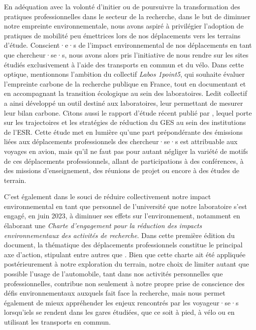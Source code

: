 \begin{refsegment}
En adéquation avec la volonté d'initier ou de poursuivre la transformation des pratiques professionnelles dans le secteur de la recherche, dans le but de diminuer notre empreinte environnementale, nous avons aspiré à privilégier l'adoption de pratiques de mobilité peu émettrices lors de nos déplacements vers les terrains d'étude. Conscient·e·s de l'impact environnemental de nos déplacements en tant que chercheur·se·s, nous avons alors pris l'initiative de nous rendre sur les sites étudiés exclusivement à l'aide des transports en commun et du vélo. Dans cette optique, mentionnons l'ambition du collectif \textsl{Labos 1point5}, qui souhaite évaluer l'empreinte carbone de la recherche publique en France, tout en documentant et en accompagnant la transition écologique au sein des laboratoires. Ledit collectif a ainsi développé un outil destiné aux laboratoires, leur permettant de mesurer leur bilan carbone. Citons aussi le rapport d'étude récent publié par \textcolor{blue}{\textcite[11]{labos_1point5_objectifs_2023}}, lequel porte sur les trajectoires et les stratégies de réduction du \acrfull{GES} au sein des institutions de l'\acrfull{ESR}. Cette étude met en lumière qu'une part prépondérante des émissions liées aux déplacements professionnels des chercheur·se·s est attribuable aux voyages en avion, mais qu'il ne faut pas pour autant négliger la variété de motifs de ces déplacements professionnels, allant de participations à des conférences, à des missions d'enseignement, des réunions de projet ou encore à des études de terrain.%

C'est également dans le souci de réduire collectivement notre impact environnemental en tant que personnel de l'université que notre laboratoire s'est engagé, en juin 2023, à diminuer ses effets sur l'environnement, notamment en élaborant une \textsl{Charte d'engagement pour la réduction des impacts environnementaux des activités de recherche}. Dans cette première édition du document, la thématique des déplacements professionnels constitue le principal axe d'action, stipulant entre autres que . Bien que cette charte ait été appliquée postérieurement à notre exploration du terrain, notre choix de limiter autant que possible l'usage de l'automobile, tant dans nos activités personnelles que professionnelles, contribue non seulement à notre propre prise de conscience des défis environnementaux auxquels fait face la recherche, mais nous permet également de mieux appréhender les enjeux rencontrés par les voyageur·se·s lorsqu'iels se rendent dans les gares étudiées, que ce soit à pied, à vélo ou en utilisant les transports en commun.%


\end{refsegment}
